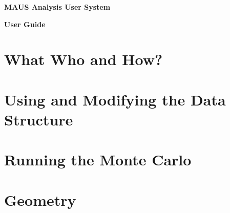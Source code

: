 \documentclass[a4paper, 10pt] {report}
\begin{document}
\vspace*{2.0cm}

\begin{center}
\Large{ \bf{MAUS Analysis User System} }

\Large{ \bf{User Guide} }
\end{center}

\tableofcontents

\newpage

\chapter{What Who and How?}


\chapter{Using and Modifying the Data Structure}


\chapter{Running the Monte Carlo}


\chapter{Geometry}


%
%
%
%
%

%


\end{document}
